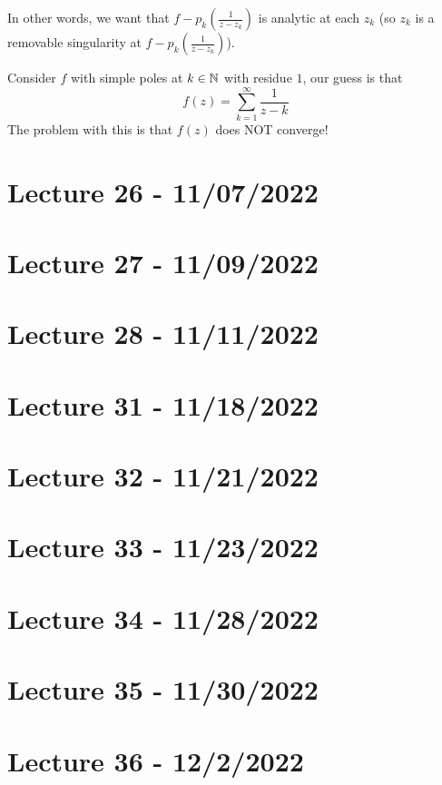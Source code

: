 \documentclass{article}
\begin{document}
In other words, we want that $f - p_k(\frac{1}{z - z_k})$ is analytic at each $z_k$ (so $z_k$ is a removable singularity at $f - p_k(\frac{1}{z - z_k})$).

\begin{example}
    Consider $f$ with simple poles at $k \in \mathbb{N}$ with residue $1$, our guess is that
    \[f(z) = \sum_{k = 1}^\infty \frac{1}{z - k}\]
    The problem with this is that $f(z)$ does NOT converge!
\end{example}
 
\newpage

\section{Lecture 26 - 11/07/2022}

\section{Lecture 27 - 11/09/2022}

\section{Lecture 28 - 11/11/2022}






\section{Lecture 31 - 11/18/2022}

\section{Lecture 32 - 11/21/2022}

\section{Lecture 33 - 11/23/2022}

\section{Lecture 34 - 11/28/2022}

\section{Lecture 35 - 11/30/2022}

\section{Lecture 36 - 12/2/2022}



\end{document}
